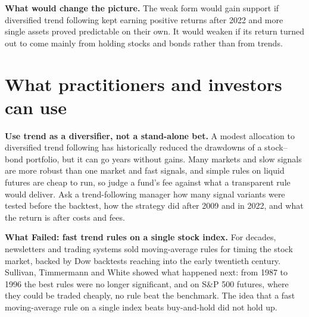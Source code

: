 \textbf{What would change the picture.} The weak form would gain support if diversified trend following kept earning positive returns after 2022 and more single assets proved predictable on their own. It would weaken if its return turned out to come mainly from holding stocks and bonds rather than from trends.

\section{What practitioners and investors can use}
\label{sec:08-investors}

\textbf{Use trend as a diversifier, not a stand-alone bet.} A modest allocation to diversified trend following has historically reduced the drawdowns of a stock--bond portfolio, but it can go years without gains. Many markets and slow signals are more robust than one market and fast signals, and simple rules on liquid futures are cheap to run, so judge a fund's fee against what a transparent rule would deliver. Ask a trend-following manager how many signal variants were tested before the backtest, how the strategy did after 2009 and in 2022, and what the return is after costs and fees.

\begin{callout}
\textbf{What Failed: fast trend rules on a single stock index.} For decades, newsletters and trading systems sold moving-average rules for timing the stock market, backed by Dow backtests reaching into the early twentieth century. Sullivan, Timmermann and White showed what happened next: from 1987 to 1996 the best rules were no longer significant, and on S\&P 500 futures, where they could be traded cheaply, no rule beat the benchmark. The idea that a fast moving-average rule on a single index beats buy-and-hold did not hold up.
\end{callout}

\makeatletter
{}
\makeatother

